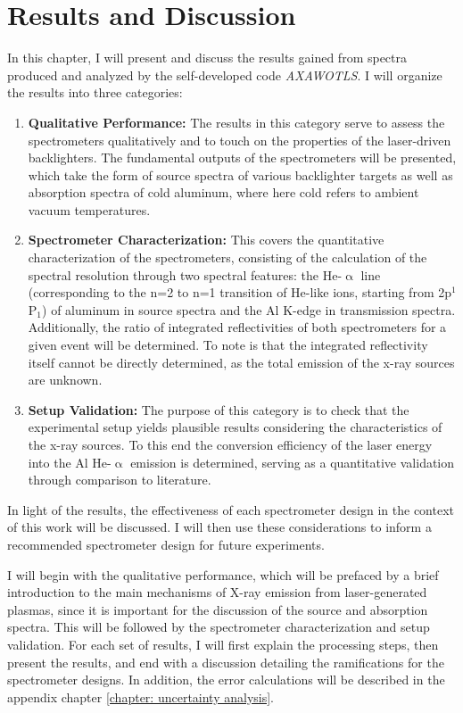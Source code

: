 \chapter{Results and Discussion}
\label{chapter: results and discussion}

In this chapter, I will present and discuss the results gained from spectra produced and analyzed by the self-developed code \textit{AXAWOTLS}. I will organize the results into three categories:

\begin{enumerate}
	\item \textbf{Qualitative Performance:} The results in this category serve to 
	assess the spectrometers qualitatively and to touch on the properties 
	of the laser-driven backlighters. The fundamental 
	outputs of the spectrometers will be presented, which take the form of source 
	spectra of various backlighter targets as well as absorption spectra of cold 
	aluminum, where here cold refers to ambient vacuum temperatures.
	\item \textbf{Spectrometer Characterization:} This covers the quantitative characterization of the spectrometers, consisting of the calculation of the spectral resolution through two spectral 
	features: the He-$\upalpha$ line (corresponding to the n=2 to n=1 transition of 
	He-like ions, starting from 2p$^1$P$_1$) of aluminum in source spectra 
	and the Al 
	K-edge in transmission spectra. Additionally, the ratio of integrated 
	reflectivities of both spectrometers for a given event will be determined. To note is that the 
	integrated reflectivity itself cannot be directly determined, as the total 
	emission of the x-ray sources are unknown.
	\item \textbf{Setup Validation:} The purpose of this category is to check that 
	the experimental setup yields plausible results considering the characteristics of the x-ray sources. To this end the conversion efficiency 
	of the laser energy into the Al He-$\upalpha$ emission is determined, serving as a quantitative validation through comparison to literature.
\end{enumerate}

In light of the results, the effectiveness of each spectrometer design in the context of this work will be discussed. I will then use these considerations to inform a recommended spectrometer design for future experiments.

I will begin with the qualitative performance, which will be 
prefaced by a brief introduction to the main mechanisms of X-ray emission from laser-generated plasmas, since 
it is important for the discussion of the source and absorption spectra. This 
will be followed by the spectrometer characterization and setup validation. For each set of results, I will first explain the processing steps, then present the results, and end with a discussion detailing the ramifications for the spectrometer designs. In addition, the error calculations will be described in the appendix chapter \ref{chapter: uncertainty analysis}.

